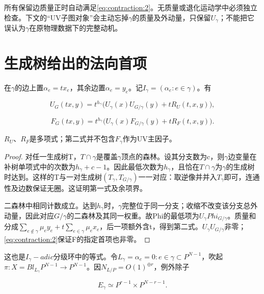\documentclass[11pt,a4paper,oneside]{ctexrep}
\theoremstyle{cnplain}
\theoremstyle{definition}
\theoremstyle{remark}
\begin{document}
所有保留边质量正时自动满足\eqref{eq:contraction:2}。无质量或退化运动学中必须独立检查。下文的``UV子图对象''会主动忘掉\(\gamma \)的质量及外动量，只保留\(U_\gamma \)；不能把它误认为\(\gamma \)在原物理数据下的完整动机。

\section{生成树给出的法向首项}\label{sec:contraction:2}

在\(\gamma \)的边上置\(\alpha _e=t x_e\)，其余边置\(\alpha _e=y_e\)。记\(I_\gamma =(\alpha _e:e\in \gamma )\)。有

\begin{equation}
U_G(tx,y)=t^{h_\gamma}\big(U_\gamma(x)U_{G/\gamma}(y)+tR_U(t,x,y)\big),
\end{equation}

\begin{equation}
F_G(tx,y)=t^{h_\gamma}\big(U_\gamma(x)F_{G/\gamma}(y)+tR_F(t,x,y)\big).       \label{eq:contraction:3}
\end{equation}

\(R_U\)、\(R_F\)是多项式；第二式并不包含\(F_\gamma \)作为UV主因子。

\begin{proof}

对任一生成树T，\(T\cap \gamma \)是覆盖\(\gamma \)顶点的森林。设其分支数为c，则\(\gamma \)边变量在补树单项式中的次数为\(h_\gamma +c- 1\)。因此最低次数为\(h_\gamma \)，且恰在\(T\cap \gamma \)为\(\gamma \)的生成树时达到。这样的T与一对生成树\((T_\gamma ,T_{G/\gamma })\)一一对应：取逆像并并入\(T_\gamma \)即可，连通性及边数保证无圈。这证明第一式及余项界。

二森林中相同计数成立。达到\(h_\gamma \)时，\(\gamma \)完整位于同一分支；收缩不改变该分支总外动量，因此对应\(G/\gamma \)的二森林及其同一权重。故Phi的最低项为\(U_\gamma  Phi_{G/\gamma }\)。质量和分成\(\sum _{e\notin \gamma }\mu _e y_e+t\sum _{e\in \gamma }\mu _e x_e\)，后一项额外含t，得到第二式。\(U_\gamma  U_{G/\gamma }\)非零；\eqref{eq:contraction:2}保证F的指定首项也非零。

\end{proof}

这也是\(I_\gamma -adic\)分级环中的等式。令\(L_\gamma ={\alpha _e=0:e\in \gamma }\subset P^{N- 1}\)，吹起\(\pi :X=Bl_{L_\gamma }P^{N- 1}\to P^{N- 1}\)。因\(N_{L/P}=O(1)^{\oplus r}\)，例外除子

\begin{equation}
E_\gamma\simeq P^{r-1}\times P^{N-r-1}.          \label{eq:contraction:4}
\end{equation}
\end{document}
